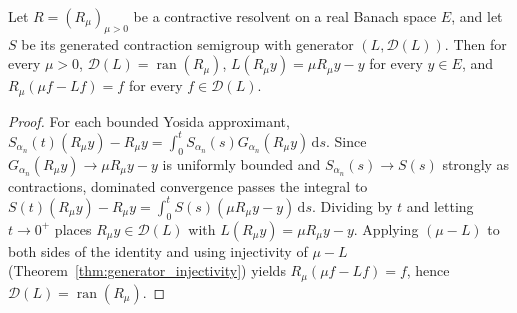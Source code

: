 \begin{theorem}\label{thm:generated_semigroup_generator_ident}
\leanok
Let $R = (R_\mu)_{\mu > 0}$ be a contractive resolvent on a real Banach space $E$, and let $S$ be its generated contraction semigroup with generator $(L, \mathcal{D}(L))$. Then for every $\mu > 0$, $\mathcal{D}(L) = \operatorname{ran}(R_\mu)$, $L(R_\mu y) = \mu R_\mu y - y$ for every $y \in E$, and $R_\mu(\mu f - L f) = f$ for every $f \in \mathcal{D}(L)$.
\end{theorem}

\begin{proof}
\leanok
For each bounded Yosida approximant, $S_{\alpha_n}(t)(R_\mu y) - R_\mu y = \int_0^t S_{\alpha_n}(s) G_{\alpha_n}(R_\mu y)\, \mathrm{d}s$. Since $G_{\alpha_n}(R_\mu y) \to \mu R_\mu y - y$ is uniformly bounded and $S_{\alpha_n}(s) \to S(s)$ strongly as contractions, dominated convergence passes the integral to $S(t)(R_\mu y) - R_\mu y = \int_0^t S(s)(\mu R_\mu y - y)\, \mathrm{d}s$. Dividing by $t$ and letting $t \to 0^+$ places $R_\mu y \in \mathcal{D}(L)$ with $L(R_\mu y) = \mu R_\mu y - y$. Applying $(\mu - L)$ to both sides of the identity and using injectivity of $\mu - L$ (Theorem~\ref{thm:generator_injectivity}) yields $R_\mu(\mu f - L f) = f$, hence $\mathcal{D}(L) = \operatorname{ran}(R_\mu)$.
\end{proof}

